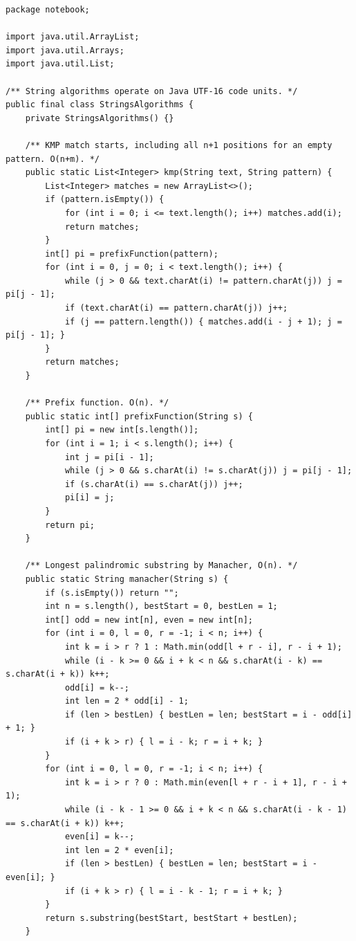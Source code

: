 \documentclass[10pt,letterpaper]{article}
\begin{document}
\begin{lstlisting}
package notebook;

import java.util.ArrayList;
import java.util.Arrays;
import java.util.List;

/** String algorithms operate on Java UTF-16 code units. */
public final class StringsAlgorithms {
    private StringsAlgorithms() {}

    /** KMP match starts, including all n+1 positions for an empty pattern. O(n+m). */
    public static List<Integer> kmp(String text, String pattern) {
        List<Integer> matches = new ArrayList<>();
        if (pattern.isEmpty()) {
            for (int i = 0; i <= text.length(); i++) matches.add(i);
            return matches;
        }
        int[] pi = prefixFunction(pattern);
        for (int i = 0, j = 0; i < text.length(); i++) {
            while (j > 0 && text.charAt(i) != pattern.charAt(j)) j = pi[j - 1];
            if (text.charAt(i) == pattern.charAt(j)) j++;
            if (j == pattern.length()) { matches.add(i - j + 1); j = pi[j - 1]; }
        }
        return matches;
    }

    /** Prefix function. O(n). */
    public static int[] prefixFunction(String s) {
        int[] pi = new int[s.length()];
        for (int i = 1; i < s.length(); i++) {
            int j = pi[i - 1];
            while (j > 0 && s.charAt(i) != s.charAt(j)) j = pi[j - 1];
            if (s.charAt(i) == s.charAt(j)) j++;
            pi[i] = j;
        }
        return pi;
    }

    /** Longest palindromic substring by Manacher, O(n). */
    public static String manacher(String s) {
        if (s.isEmpty()) return "";
        int n = s.length(), bestStart = 0, bestLen = 1;
        int[] odd = new int[n], even = new int[n];
        for (int i = 0, l = 0, r = -1; i < n; i++) {
            int k = i > r ? 1 : Math.min(odd[l + r - i], r - i + 1);
            while (i - k >= 0 && i + k < n && s.charAt(i - k) == s.charAt(i + k)) k++;
            odd[i] = k--;
            int len = 2 * odd[i] - 1;
            if (len > bestLen) { bestLen = len; bestStart = i - odd[i] + 1; }
            if (i + k > r) { l = i - k; r = i + k; }
        }
        for (int i = 0, l = 0, r = -1; i < n; i++) {
            int k = i > r ? 0 : Math.min(even[l + r - i + 1], r - i + 1);
            while (i - k - 1 >= 0 && i + k < n && s.charAt(i - k - 1) == s.charAt(i + k)) k++;
            even[i] = k--;
            int len = 2 * even[i];
            if (len > bestLen) { bestLen = len; bestStart = i - even[i]; }
            if (i + k > r) { l = i - k - 1; r = i + k; }
        }
        return s.substring(bestStart, bestStart + bestLen);
    }


\end{lstlisting}
\end{document}
